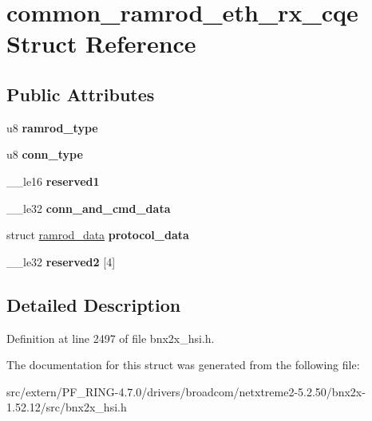 \hypertarget{structcommon__ramrod__eth__rx__cqe}{
\section{common\_\-ramrod\_\-eth\_\-rx\_\-cqe Struct Reference}
\label{structcommon__ramrod__eth__rx__cqe}
}
\subsection*{Public Attributes}
\begin{DoxyCompactItemize}
\item 
\hypertarget{structcommon__ramrod__eth__rx__cqe_a403f0048e84c4c533f3fc30b48aba0a3}{
u8 {\bfseries ramrod\_\-type}}
\label{structcommon__ramrod__eth__rx__cqe_a403f0048e84c4c533f3fc30b48aba0a3}

\item 
\hypertarget{structcommon__ramrod__eth__rx__cqe_adacbfd0a3a7663728e2f531d6ff3d4ed}{
u8 {\bfseries conn\_\-type}}
\label{structcommon__ramrod__eth__rx__cqe_adacbfd0a3a7663728e2f531d6ff3d4ed}

\item 
\hypertarget{structcommon__ramrod__eth__rx__cqe_a988a3d03b24de7ceab397c8682668165}{
\_\-\_\-le16 {\bfseries reserved1}}
\label{structcommon__ramrod__eth__rx__cqe_a988a3d03b24de7ceab397c8682668165}

\item 
\hypertarget{structcommon__ramrod__eth__rx__cqe_aa48542c7c0fd53c033ce0f5cd2094dbf}{
\_\-\_\-le32 {\bfseries conn\_\-and\_\-cmd\_\-data}}
\label{structcommon__ramrod__eth__rx__cqe_aa48542c7c0fd53c033ce0f5cd2094dbf}

\item 
\hypertarget{structcommon__ramrod__eth__rx__cqe_a73d4b98a709277ea8ebbac847eb0d711}{
struct \hyperlink{structramrod__data}{ramrod\_\-data} {\bfseries protocol\_\-data}}
\label{structcommon__ramrod__eth__rx__cqe_a73d4b98a709277ea8ebbac847eb0d711}

\item 
\hypertarget{structcommon__ramrod__eth__rx__cqe_aab4cf4de2a2a416ad26be2113532428f}{
\_\-\_\-le32 {\bfseries reserved2} \mbox{[}4\mbox{]}}
\label{structcommon__ramrod__eth__rx__cqe_aab4cf4de2a2a416ad26be2113532428f}

\end{DoxyCompactItemize}


\subsection{Detailed Description}


Definition at line 2497 of file bnx2x\_\-hsi.h.



The documentation for this struct was generated from the following file:\begin{DoxyCompactItemize}
\item 
src/extern/PF\_\-RING-\/4.7.0/drivers/broadcom/netxtreme2-\/5.2.50/bnx2x-\/1.52.12/src/bnx2x\_\-hsi.h\end{DoxyCompactItemize}
